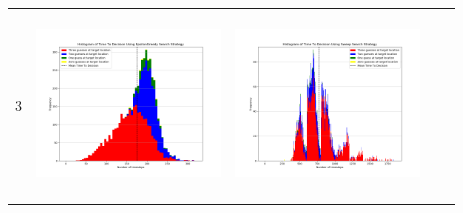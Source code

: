 \begin{landscape}
\begin{table}[h!]
\begin{tabular}{ | c | c | c | c | c |}
    3 & 
    \begin{minipage}[c][49mm][c]{49mm}
      \includegraphics[width=49mm, height=49mm]{Chapters/MultiAgentTargetDetection/Figs/Histograms/MultipleTarget/3/3EpsilonGreedyHistogram.png}
    \end{minipage}
    &
    \begin{minipage}[c][49mm][c]{49mm}
      \includegraphics[width=49mm, height=49mm]{Chapters/MultiAgentTargetDetection/Figs/Histograms/MultipleTarget/3/3SweepHistogram.png}


\end{minipage}
\end{tabular}
\end{table}
\end{landscape}
